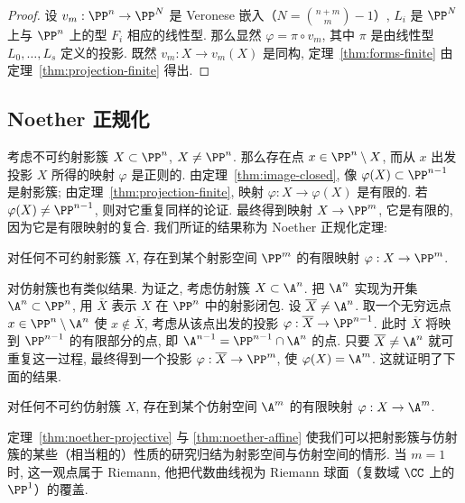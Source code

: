 \begin{proof}
	设 $v_m: \PP^n \to \PP^N$ 是 Veronese 嵌入（$N = \binom{n+m}{m} - 1$）, $L_i$ 是 $\PP^N$ 上与 $\PP^n$ 上的型 $F_i$ 相应的线性型. 那么显然 $\varphi = \pi \circ v_m$, 其中 $\pi$ 是由线性型 $L_0, \ldots, L_s$ 定义的投影. 既然 $v_m: X \to v_m(X)$ 是同构, 定理~\ref{thm:forms-finite} 由定理~\ref{thm:projection-finite} 得出.
\end{proof}

\subsection{Noether 正规化}

考虑不可约射影簇 $X \subset \PP^n$, $X \ne \PP^n$. 那么存在点 $x \in \PP^n \setminus X$, 而从 $x$ 出发投影 $X$ 所得的映射 $\varphi$ 是正则的. 由定理~\ref{thm:image-closed}, 像 $\varphi(X) \subset \PP^{n-1}$ 是射影簇; 由定理~\ref{thm:projection-finite}, 映射 $\varphi: X \to \varphi(X)$ 是有限的. 若 $\varphi(X) \ne \PP^{n-1}$, 则对它重复同样的论证. 最终得到映射 $X \to \PP^m$, 它是有限的, 因为它是有限映射的复合. 我们所证的结果称为 Noether 正规化定理:

\begin{theorem}\label{thm:noether-projective}
	对任何不可约射影簇 $X$, 存在到某个射影空间 $\PP^m$ 的有限映射 $\varphi: X \to \PP^m$.
\end{theorem}

对仿射簇也有类似结果. 为证之, 考虑仿射簇 $X \subset \A^n$. 把 $\A^n$ 实现为开集 $\A^n \subset \PP^n$, 用 $\overline{X}$ 表示 $X$ 在 $\PP^n$ 中的射影闭包. 设 $\overline{X} \ne \A^n$. 取一个无穷远点 $x \in \PP^n \setminus \A^n$ 使 $x \notin \overline{X}$, 考虑从该点出发的投影 $\varphi: \overline{X} \to \PP^{n-1}$. 此时 $\overline{X}$ 将映到 $\PP^{n-1}$ 的有限部分的点, 即 $\A^{n-1} = \PP^{n-1} \cap \A^n$ 的点. 只要 $\overline{X} \ne \A^n$ 就可重复这一过程, 最终得到一个投影 $\varphi: \overline{X} \to \PP^m$, 使 $\varphi(X) = \A^m$. 这就证明了下面的结果.

\begin{theorem}\label{thm:noether-affine}
	对任何不可约仿射簇 $X$, 存在到某个仿射空间 $\A^m$ 的有限映射 $\varphi: X \to \A^m$.
\end{theorem}

定理~\ref{thm:noether-projective} 与 \ref{thm:noether-affine} 使我们可以把射影簇与仿射簇的某些（相当粗的）性质的研究归结为射影空间与仿射空间的情形. 当 $m = 1$ 时, 这一观点属于 Riemann, 他把代数曲线视为 Riemann 球面（复数域 $\CC$ 上的 $\PP^1$）的覆盖.

